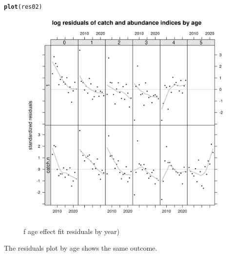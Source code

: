 \documentclass[a4paper,english,11pt]{article}\usepackage[]{graphicx}\usepackage[]{xcolor}
\makeatletter
\newcommand{\hldef}[1]{\textcolor[rgb]{0.345,0.345,0.345}{#1}}%
\newcommand{\hlkwd}[1]{\textcolor[rgb]{0.737,0.353,0.396}{\textbf{#1}}}%
\newenvironment{kframe}{%
 \def\at@end@of@kframe{}%
 \ifinner\ifhmode%
  \def\at@end@of@kframe{\end{minipage}}%
  \begin{minipage}{\columnwidth}%
 \fi\fi%
 \def\FrameCommand##1{\hskip\@totalleftmargin \hskip-\fboxsep
 \colorbox{shadecolor}{##1}\hskip-\fboxsep
     \hskip-\linewidth \hskip-\@totalleftmargin \hskip\columnwidth}%
 \MakeFramed {\advance\hsize-\width
   \@totalleftmargin\z@ \linewidth\hsize
   \@setminipage}}%
 {\par\unskip\endMakeFramed%
 \at@end@of@kframe}
\newenvironment{knitrout}{}{} %
\makeatother
\begin{document}
\begin{knitrout}
\color{fgcolor}\begin{kframe}
\begin{alltt}
\hlkwd{plot}\hldef{(res02)}
\end{alltt}
\end{kframe}\begin{figure}[H]

{\centering \includegraphics[width=.9\linewidth]{figure/fageresbyyear-1} 

}

\caption[f age effect fit residuals by year)]{f age effect fit residuals by year)}\label{fig:fageresbyyear}
\end{figure}

\end{knitrout}

The residuals plot by age shows the same outcome.  
\end{document}
